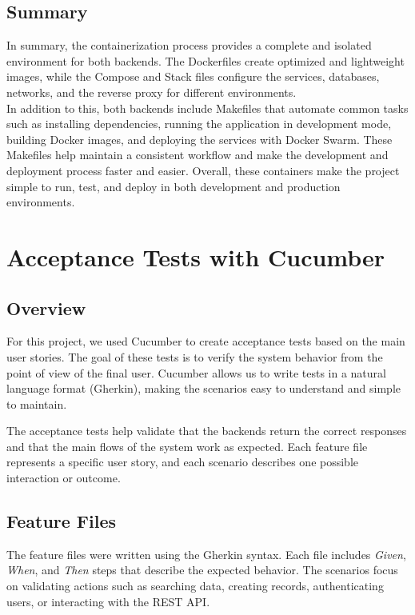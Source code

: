 \documentclass[12pt,a4paper]{article}
\begin{document}
\subsection{Summary}

In summary, the containerization process provides a complete and isolated environment for both backends. 
The Dockerfiles create optimized and lightweight images, while the Compose and Stack files configure the services, databases, networks, and the reverse proxy for different environments.\\ 

In addition to this, both backends include Makefiles that automate common tasks such as installing dependencies, running the application in development mode, building Docker images, and deploying the services with Docker Swarm. 
These Makefiles help maintain a consistent workflow and make the development and deployment process faster and easier. 
Overall, these containers make the project simple to run, test, and deploy in both development and production environments.

\section{Acceptance Tests with Cucumber}

\subsection{Overview}
For this project, we used Cucumber to create acceptance tests based on the main user stories. The goal of these tests is to verify the system behavior from the point of view of the final user. Cucumber allows us to write tests in a natural language format (Gherkin), making the scenarios easy to understand and simple to maintain.

The acceptance tests help validate that the backends return the correct responses and that the main flows of the system work as expected. Each feature file represents a specific user story, and each scenario describes one possible interaction or outcome.

\subsection{Feature Files}

The feature files were written using the Gherkin syntax. Each file includes \textit{Given}, \textit{When}, and \textit{Then} steps that describe the expected behavior. The scenarios focus on validating actions such as searching data, creating records, authenticating users, or interacting with the REST API.\\ 
\end{document}
